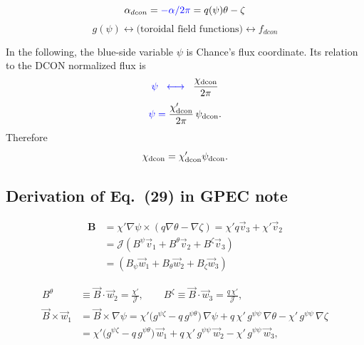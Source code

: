 \documentclass[10pt,a4paper]{article}
\numberwithin{equation}{section}
\begin{document}
\begin{equation}
    \alpha_{dcon} = \color{blue} {- \alpha / 2 \pi} \color{black}= q(\psi)\theta - \zeta 
\end{equation}
\begin{equation}
g(\psi) \leftrightarrow \text{(toroidal field functions)} \leftrightarrow f_{dcon}
\end{equation}

In the following, the blue-side variable $\psi$ is Chance's flux
coordinate.  Its relation to the DCON normalized flux is
\[
\color{blue}{\psi}
\;\;\longleftrightarrow\;\;
\color{black}\frac{\chi_{\mathrm{dcon}}}{2\pi}
\]
%
\[
\color{blue}{\psi}
= \color{black}\frac{\chi'_{\mathrm{dcon}}}{2\pi}\,
\psi_{\mathrm{dcon}}.
\]
Therefore
\[
{\chi}_{\mathrm{dcon}} = \color{black}\chi'_{\mathrm{dcon}} \psi_{\mathrm{dcon}}.
\]


\subsection{Derivation of Eq.~(29) in GPEC note}

\begin{equation}
    \begin{aligned}
    \mathbf{B}
    &= \chi\prime \nabla \psi \times (q\nabla \theta - \nabla \zeta) = \chi\prime q \vec{v}_3 + \chi\prime \vec{v}_2 \\
    &= \mathcal{J}(B^\psi \vec{v}_1 + B^\theta \vec{v}_2 + B^\zeta \vec{v}_3) \\
    &= (B_\psi \vec{w}_1 + B_\theta \vec{w}_2 + B_\zeta \vec{w}_3) 
\end{aligned}
\end{equation}


\begin{equation}
\begin{aligned}
B^\theta &\equiv \vec{B}\cdot \vec{w}_2 = \frac{\chi'}{\mathcal{J}},
\qquad
B^\zeta \equiv \vec{B}\cdot \vec{w}_3 = \frac{q\,\chi'}{\mathcal{J}}, \\[4pt]
\vec{B} \times \vec{w}_1
&= \vec{B}\times\nabla\psi
= \chi'\big(g^{\psi\zeta}-q\,g^{\psi\theta}\big)\,\nabla\psi
+ q\,\chi'\,g^{\psi\psi}\,\nabla\theta
- \chi'\,g^{\psi\psi}\,\nabla\zeta \\
&= \chi'\big(g^{\psi\zeta}-q\,g^{\psi\theta}\big)\,\vec{w}_1
+ q\,\chi'\,g^{\psi\psi}\,\vec{w}_2
- \chi'\,g^{\psi\psi}\,\vec{w}_3,
\end{aligned}
\end{equation}
\end{document}

